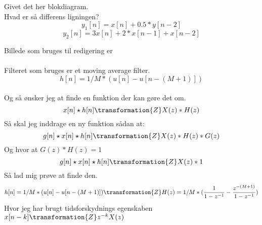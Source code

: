 \begin{Øvelser}
    \begin{kapitel}[Introduktion]
        \begin{Øvelse}[Blokdiagrammer]
            Givet det her blokdiagram. 
            \\
            Hvad er så differens ligningen? 
            \[y_1[n] = x[n] + 0.5 * y[n-2]\] 
            \[y_2[n] = 3x[n] + 2*x[n-1] + x[n - 2]\]
        \end{Øvelse}
    \end{kapitel}
    \begin{kapitel}        
    \end{kapitel}
    \begin{kapitel}[Z domænet]
        \begin{Øvelse}
            Billede som bruges til redigering er \\
            \\
            Filteret som bruges er et moving average filter. 
            \[h[n] = 1/M * (u[n] - u[n - (M+1)])\]
            \\
            Og så ønsker jeg at finde en funktion der kan gøre det om. 
            \[x[n]\star h[n] \transformation{Z} X(z)*H(z)\]
            Så skal jeg inddrage en ny funktion sådan at: 
            \[g[n]\star x[n]\star h[n] \transformation{Z} X(z)*H(z)*G(z)\]
            Og hvor at $G(z)*H(z) = 1$
            \[g[n]\star x[n]\star h[n] \transformation{Z} X(z)*1\]
            Så lad mig prøve at finde den. \\
            \[h[n] = 1/M * (u[n] - u[n - (M+1)]) \transformation{Z} H(z) = 1/M * (\frac{1}{1 - z^{-1}} - \frac{z^{-(M+1)}}{1 - z^{-1}})\]
            Hvor jeg har brugt tidsforskydnings egenskaben $x[n-k] \transformation{Z}  z^{-k}X(z)$\\


\end{Øvelse}
\end{kapitel}
\end{Øvelser}
